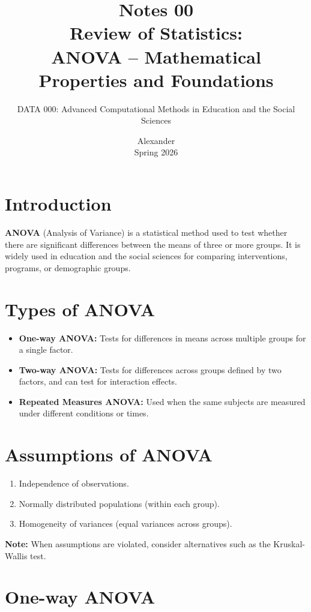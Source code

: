 \documentclass[11pt]{article}
\title{Notes 00 \\ Review of Statistics: \\ ANOVA -- Mathematical Properties and Foundations}
\author{DATA 000: Advanced Computational Methods in Education and the Social Sciences}
\date{Alexander \\ Spring 2026}
\begin{document}
\maketitle

\tableofcontents

\section{Introduction}

\textbf{ANOVA} (Analysis of Variance) is a statistical method used to test whether there are significant differences between the means of three or more groups. It is widely used in education and the social sciences for comparing interventions, programs, or demographic groups.

\section{Types of ANOVA}

\begin{itemize}
    \item \textbf{One-way ANOVA:} Tests for differences in means across multiple groups for a single factor.
    \item \textbf{Two-way ANOVA:} Tests for differences across groups defined by two factors, and can test for interaction effects.
    \item \textbf{Repeated Measures ANOVA:} Used when the same subjects are measured under different conditions or times.
\end{itemize}

\section{Assumptions of ANOVA}

\begin{enumerate}
    \item Independence of observations.
    \item Normally distributed populations (within each group).
    \item Homogeneity of variances (equal variances across groups).
\end{enumerate}

\textbf{Note:} When assumptions are violated, consider alternatives such as the Kruskal-Wallis test.

\section{One-way ANOVA}
\end{document}
